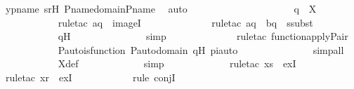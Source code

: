 \begin{isabellebody}
\ ypname\ srH\ P{\isacharunderscore}{\kern0pt}name{\isacharunderscore}{\kern0pt}domain{\isacharunderscore}{\kern0pt}P{\isacharunderscore}{\kern0pt}name\ \isamarkupfalse%
\ auto\ \isanewline
\ \ \ \ \ \ \ \ \isanewline
\ \ \ \ \ \ \ \ \isamarkupfalse%
\ \isamarkupfalse%
\ {\isachardoublequoteopen}q{\isacharprime}{\kern0pt}\ {\isasymin}\ {\isasympi}{\isacharbackquote}{\kern0pt}{\isacharbackquote}{\kern0pt}X{\isachardoublequoteclose}\ \isanewline
\ \ \ \ \ \ \ \ \ \ \isamarkupfalse%
\ {\isacharparenleft}{\kern0pt}rule{\isacharunderscore}{\kern0pt}tac\ a{\isacharequal}{\kern0pt}q\ \ imageI{\isacharparenright}{\kern0pt}\ \isanewline
\ \ \ \ \ \ \ \ \ \ \ \isamarkupfalse%
\ {\isacharparenleft}{\kern0pt}rule{\isacharunderscore}{\kern0pt}tac\ a{\isacharequal}{\kern0pt}{\isachardoublequoteopen}{\isasympi}{\isacharbackquote}{\kern0pt}q{\isachardoublequoteclose}\ \ b{\isacharequal}{\kern0pt}q{\isacharprime}{\kern0pt}\ \ ssubst{\isacharparenright}{\kern0pt}\isanewline
\ \ \ \ \ \ \ \ \ \ \isamarkupfalse%
\ qH\ \isanewline
\ \ \ \ \ \ \ \ \ \ \ \ \isamarkupfalse%
\ simp\ \isanewline
\ \ \ \ \ \ \ \ \ \ \ \isamarkupfalse%
\ {\isacharparenleft}{\kern0pt}rule{\isacharunderscore}{\kern0pt}tac\ function{\isacharunderscore}{\kern0pt}apply{\isacharunderscore}{\kern0pt}Pair{\isacharparenright}{\kern0pt}\ \isanewline
\ \ \ \ \ \ \ \ \ \ \isamarkupfalse%
\ P{\isacharunderscore}{\kern0pt}auto{\isacharunderscore}{\kern0pt}is{\isacharunderscore}{\kern0pt}function\ P{\isacharunderscore}{\kern0pt}auto{\isacharunderscore}{\kern0pt}domain\ qH\ piauto\ \isanewline
\ \ \ \ \ \ \ \ \ \ \ \ \isamarkupfalse%
\ simp{\isacharunderscore}{\kern0pt}all\isanewline
\ \ \ \ \ \ \ \ \ \ \isamarkupfalse%
\ X{\isacharunderscore}{\kern0pt}def\ \isanewline
\ \ \ \ \ \ \ \ \ \ \isamarkupfalse%
\ simp\ \isanewline
\ \ \ \ \ \ \ \ \ \ \isamarkupfalse%
\ {\isacharparenleft}{\kern0pt}rule{\isacharunderscore}{\kern0pt}tac\ x{\isacharequal}{\kern0pt}s\ \ exI{\isacharparenright}{\kern0pt}\isanewline
\ \ \ \ \ \ \ \ \ \ \isamarkupfalse%
\ {\isacharparenleft}{\kern0pt}rule{\isacharunderscore}{\kern0pt}tac\ x{\isacharequal}{\kern0pt}r\ \ exI{\isacharparenright}{\kern0pt}\isanewline
\ \ \ \ \ \ \ \ \ \ \isamarkupfalse%
\ {\isacharparenleft}{\kern0pt}rule\ conjI{\isacharparenright}{\kern0pt}\ \isanewline

\end{isabellebody}
